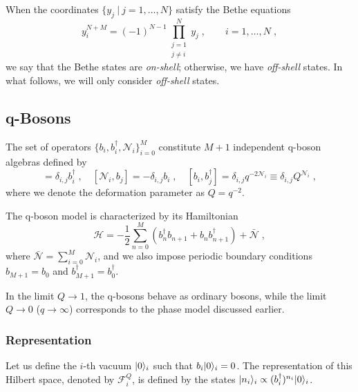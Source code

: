 \documentclass[a4paper,11pt]{amsart}
\begin{document}
When the coordinates \(\{ y_j \ | \ j =1, \dots , N\}\) satisfy the Bethe equations
\begin{equation}
\label{eq:bethe_eq}
  y^{N + M}_i = (-1)^{N-1} \prod_{\substack{j = 1 \\ j \neq i}}^N y_j\; , \qquad i = 1, \dots, N\; , 
\end{equation}
we say that the Bethe states are \emph{on-shell}; otherwise, we have
\emph{off-shell} states. In what follows, we will only consider
\emph{off-shell} states.


\subsection{q-Bosons}
The set of operators \(\{b_i, b_i^\dagger,\mathcal{N}_i\}_{i=0}^M\) constitute
\(M+1\) independent q-boson algebras defined by
\begin{equation}
[\mathcal{N}_i, b_j^\dagger]=\delta_{i,j} b_i^\dagger\; , \quad 
[\mathcal{N}_i, b_j]=-\delta_{i,j}b_i\; , \quad
[b_i, b_j^\dagger]= \delta_{i,j} q^{-2\mathcal{N}_i}  \equiv \delta_{i,j} Q^{\mathcal{N}_i}\; , 
\end{equation}
where we denote the deformation parameter as \(Q = q^{-2}\).

The q-boson model is characterized by its Hamiltonian
\begin{equation}
  \mathcal{H} = -\frac{1}{2} \sum_{n=0}^M
  \left(b_n^\dagger b_{n+1} + b_n b_{n+1}^\dagger \right) + \bar{\mathcal{N}}\; ,
\end{equation}
where \(\bar{\mathcal{N}} = \sum_{i=0}^M \mathcal{N}_i\), and we also
impose periodic boundary conditions \(b_{M+1} = b_0\) and
\(b_{M+1}^\dagger = b_0^\dagger\).

In the limit \(Q \to 1\), the q-bosons behave as ordinary bosons,
while the limit \(Q \to 0\) (\(q \to \infty\)) corresponds to the
phase model discussed earlier.


\subsubsection{Representation}
Let us define the \(i\)-th vacuum \(\lvert0\rangle_i\) such that
\(b_i\lvert0\rangle_i = 0\). The representation of this Hilbert space,
denoted by \(\mathcal{F}_i^Q\), is defined by the states
\(\lvert n_i\rangle_i \propto (b_i^\dagger)^{n_i} \lvert0\rangle_i\).
\end{document}
